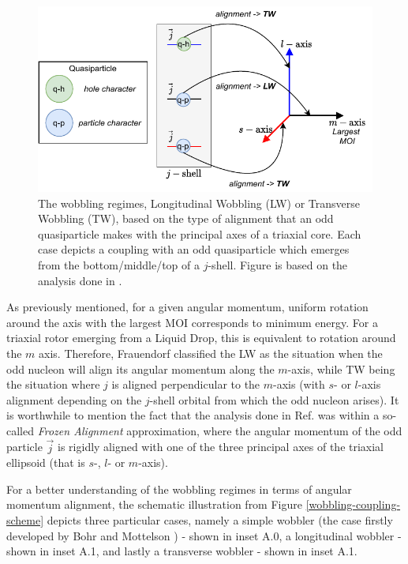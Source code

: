 \documentclass[11pt]{article}
\begin{document}
\begin{figure}
    \centering
    \includegraphics[scale=0.9]{figs/wobbling_Regimes_updated.pdf}
    \caption{The wobbling regimes, Longitudinal Wobbling (LW) or Transverse Wobbling (TW), based on the type of alignment that an odd quasiparticle makes with the principal axes of a triaxial core. Each case depicts a coupling with an odd quasiparticle which emerges from the bottom/middle/top of a $j$-shell. Figure is based on the analysis done in \cite{frauendorf2014transverse}.}
    \label{quasiparticle-alignment}
\end{figure}

As previously mentioned, for a given angular momentum, uniform rotation around the axis with the largest MOI corresponds to minimum energy. For a triaxial rotor emerging from a Liquid Drop, this is equivalent to rotation around the $m$ axis. Therefore, Frauendorf \cite{frauendorf2014transverse} classified the LW as the situation when the odd nucleon will align its angular momentum along the $m$-axis, while TW being the situation where $j$ is aligned perpendicular to the $m$-axis (with $s$- or $l$-axis alignment depending on the $j$-shell orbital from which the odd nucleon arises). It is worthwhile to mention the fact that the analysis done in Ref. \cite{frauendorf2014transverse} was within a so-called \emph{Frozen Alignment} approximation, where the angular momentum of the odd particle $\vec{j}$ is rigidly aligned with one of the three principal axes of the triaxial ellipsoid (that is $s$-, $l$- or $m$-axis).

For a better understanding of the wobbling regimes in terms of angular momentum alignment, the schematic illustration from Figure \ref{wobbling-coupling-scheme} depicts three particular cases, namely a simple wobbler (the case firstly developed by Bohr and Mottelson \cite{bohr1998nuclear}) - shown in inset A.0, a longitudinal wobbler - shown in inset A.1, and lastly a transverse wobbler - shown in inset A.1.
\end{document}
